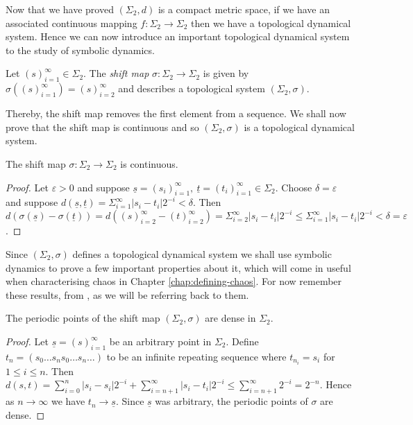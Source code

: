 Now that we have proved $(\Sigma_2, d)$ is a compact metric space, if we have an associated continuous mapping $f: \Sigma_2 \to \Sigma_2$ then we have a topological dynamical system. Hence we can now introduce an important topological dynamical system to the study of symbolic dynamics.

\begin{defn} 
    Let $(s)_{i=1}^{\infty} \in \Sigma_2$. The \emph{shift map} $\sigma: \Sigma_2 \to \Sigma_2$ is given by $\sigma \left((s)_{i=1}^{\infty}\right) = (s)_{i=2}^{\infty}$ and describes a topological system $(\Sigma_2, \sigma)$.
\end{defn}

Thereby, the shift map removes the first element from a sequence. We shall now prove that the shift map is continuous and so $(\Sigma_2, \sigma)$ is a topological dynamical system.

\begin{prop}
    The shift map $\sigma: \Sigma_2 \to \Sigma_2$ is continuous.
    \begin{proof}
        Let $\varepsilon > 0$ and suppose $\underline{s} = (s_i)_{i=1}^{\infty}, \ \underline{t} = (t_i)_{i=1}^{\infty} \in \Sigma_2$. Choose $\delta = \varepsilon$ and suppose $d(\underline{s}, \underline{t}) = \Sigma_{i=1}^{\infty}|s_i - t_i|2^{-i} < \delta$. Then $d\left( \sigma\left(\underline{s}\right) - \sigma\left(\underline{t}\right) \right) = d\left((s)_{i=2}^{\infty} - (t)_{i=2}^{\infty}\right) = \Sigma_{i=2}^{\infty}|s_i - t_i|2^{-i} \leq \Sigma_{i=1}^{\infty}|s_i - t_i|2^{-i} < \delta = \varepsilon$.
    \end{proof}
\end{prop}

Since $(\Sigma_2, \sigma)$ defines a topological dynamical system we shall use symbolic dynamics to prove a few important properties about it, which will come in useful when characterising chaos in Chapter \ref{chap:defining-chaos}. For now remember these results, from \cite[\S 1.6]{devaney}, as we will be referring back to them.

\begin{prop} \label{prop:shift-map-periodic-points-dense}
    The periodic points of the shift map $(\Sigma_2, \sigma)$ are dense in $\Sigma_2$.
    \begin{proof}
        Let $\underline{s} = (s)_{i=1}^{\infty}$ be an arbitrary point in $\Sigma_2$. Define $t_n = (s_0\dots s_ns_0\dots s_n\dots)$ to be an infinite repeating sequence where $t_{n_i} = s_i$ for $1 \leq i \leq n$. Then $d(s, t) = \sum_{i = 0}^n|s_i - s_i|2^{-i} + \sum_{i=n+1}^{\infty}|s_i - t_i|2^{-i} \leq \sum_{i = n+1}^{\infty}2^{-i} = 2^{-n}$. Hence as $n \to \infty$ we have $t_n \to \underline{s}$. Since $\underline{s}$ was arbitrary, the periodic points of $\sigma$ are dense.
    \end{proof}
\end{prop}

